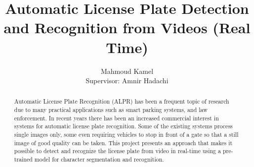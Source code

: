 \documentclass[letterpaper,12pt]{article}
\begin{document}
\title{Automatic License Plate Detection and Recognition from Videos (Real Time)}

\author{Mahmoud Kamel\\[1cm]{\small Supervisor: Amnir Hadachi}}

\date{\vspace{-5ex}}
\maketitle


\vspace{30 mm}
\begin{abstract}
Automatic License Plate Recognition (ALPR) has been a frequent topic of research due to many practical applications such as smart parking systems, and law enforcement. In recent years there has been an increased commercial interest in systems
for automatic license plate recognition. Some of the existing systems process single images only, some even requiring vehicles to stop in front of a gate so that a still image of good quality can be taken. This project presents an approach that makes it possible to detect and recognize the license plate from video in real-time using a pre-trained model for character segmentation and recognition.
\end{abstract}
\end{document}

